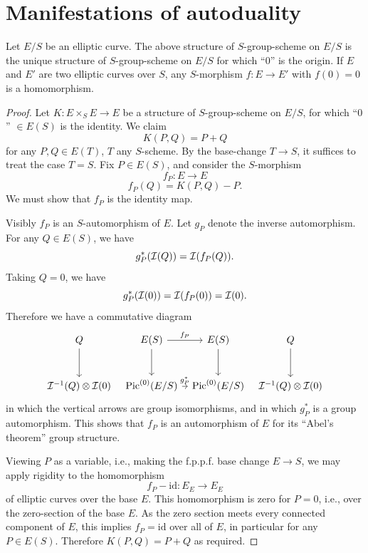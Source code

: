 \section{Manifestations of autoduality}
\label{sec:2.5}

\begin{theorem}\label{thm:2.5.1}
Let $E/S$ be an elliptic curve. The above structure of $S$-group-scheme on $E/S$ is the unique structure of $S$-group-scheme on $E/S$ for which ``$0$'' is the origin. If $E$ and $E'$ are two elliptic curves over $S$, any $S$-morphism $f : E \to E'$ with $f(0) = 0$ is a homomorphism.
\end{theorem}

\begin{proof}
Let $K : E \times_S E \to E$ be a structure of $S$-group-scheme on $E/S$, for which ``$0$'' $\in E(S)$ is the identity. We claim
\[
K(P, Q) = P + Q
\]
for any $P, Q \in E(T)$, $T$ any $S$-scheme. By the base-change $T \to S$, it suffices to treat the case $T = S$. Fix $P \in E(S)$, and consider the $S$-morphism
\[
f_P : E \longrightarrow E
\]
\[
f_P(Q) = K(P, Q) - P.
\]
We must show that $f_P$ is the identity map.

Visibly $f_P$ is an $S$-automorphism of $E$. Let $g_P$ denote the inverse automorphism. For any $Q \in E(S)$, we have
\[
g_P^*(\mathcal{I}(Q)) = \mathcal{I}(f_P(Q)).
\]
Taking $Q = 0$, we have
\[
g_P^*(\mathcal{I}(0)) = \mathcal{I}(f_P(0)) = \mathcal{I}(0).
\]
Therefore we have a commutative diagram
\[
\begin{tikzcd}[row sep=large, column sep=tiny, every label/.append style={font=\scriptsize}]
  Q \arrow[d] & E(S) \arrow[r, "f_P"] \arrow[d] & E(S) \arrow[d] & Q \arrow[d] \\
  \cI^{-1}(Q) \otimes \cI(0) & \Pic^{(0)}(E/S) \arrow[r, "g_P^*"] & \Pic^{(0)}(E/S) & \cI^{-1}(Q) \otimes \cI(0)
\end{tikzcd}
\]
in which the vertical arrows are group isomorphisms, and in which $g_P^*$ is a group automorphism. This shows that $f_P$ is an automorphism of $E$ for its ``Abel's theorem'' group structure.

Viewing $P$ as a variable, i.e., making the f.p.p.f. base change $E \to S$, we may apply rigidity to the homomorphism
\[
f_P - \mathrm{id} : E_E \longrightarrow E_E
\]
of elliptic curves over the base $E$. This homomorphism is zero for $P = 0$, i.e., over the zero-section of the base $E$. As the zero section meets every connected component of $E$, this implies $f_P = \mathrm{id}$ over all of $E$, in particular for any $P \in E(S)$. Therefore $K(P, Q) = P + Q$ as required.


\end{proof}
